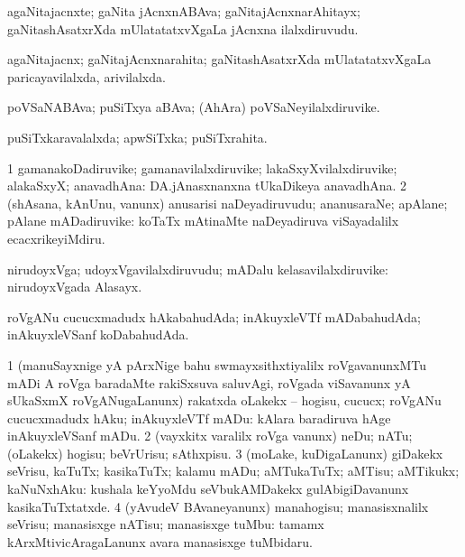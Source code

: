 \bentry
{}
\gl{\nA}
\bmng
agaNitajacnxte; gaNita jAcnxnABAva; gaNitajAcnxnarAhitayx; gaNitashAsatxrXda mUlatatatxvXgaLa jAcnxna ilalxdiruvudu. 
\emng
\eentry

\bentry
{}
\gl{\gu}
\bmng
agaNitajacnx; gaNitajAcnxnarahita; gaNitashAsatxrXda mUlatatatxvXgaLa paricayavilalxda, arivilalxda. 
\emng
\eentry

\bentry
{}
\gl{\nA}
\bmng
poVSaNABAva; puSiTxya aBAva; (AhAra) poVSaNeyilalxdiruvike. 
\emng
\eentry

\bentry
{}
\gl{\gu}
\bmng
puSiTxkaravalalxda; apwSiTxka; puSiTxrahita. 
\emng
\eentry

\bentry
{}
\gl{\nA}
\bmng
\bnum
\num{1} gamanakoDadiruvike; gamanavilalxdiruvike; lakaSxyXvilalxdiruvike; alakaSxyX; anavadhAna:  DA.jAnasxnanxna tUkaDikeya anavadhAna. 
\num{2} (shAsana, kAnUnu, \mo vanunx) anusarisi naDeyadiruvudu; ananusaraNe; apAlane; pAlane mADadiruvike:  koTaTx mAtinaMte naDeyadiruva viSayadalilx ecacxrikeyiMdiru. 
\enum
\emng
\eentry

\bentry
{}
\gl{\nA}
\bmng
nirudoyxVga; udoyxVgavilalxdiruvudu; mADalu kelasavilalxdiruvike:  nirudoyxVgada Alasayx. 
\emng
\eentry

\bentry
{}
\gl{\gu}
\bmng
roVgANu cucucxmadudx hAkabahudAda; inAkuyxleVTf mADabahudAda; inAkuyxleVSanf koDabahudAda. 
\emng
\eentry

\bentry
{}
\gl{\sakirx}
\bmng
\bnum
\num{1} (manuSayxnige yA pArxNige bahu swmayxsithxtiyalilx roVgavanunxMTu mADi A roVga baradaMte rakiSxsuva saluvAgi, roVgada viSavanunx yA sUkaSxmX roVgANugaLanunx) rakatxda oLakekx -- hogisu, cucucx; roVgANu cucucxmadudx hAku; inAkuyxleVTf mADu:  kAlara baradiruva hAge inAkuyxleVSanf mADu. 
\num{2} (vayxkitx \mo varalilx roVga \mo vanunx) neDu; nATu; (oLakekx) hogisu; beVrUrisu; sAthxpisu. 
\num{3} (moLake, kuDigaLanunx) giDakekx seVrisu, kaTuTx; kasikaTuTx; kalamu mADu; aMTukaTuTx; aMTisu; aMTikukx; kaNuNxhAku:  kushala keYyoMdu seVbukAMDakekx gulAbigiDavanunx kasikaTuTxtatxde. 
\num{4} (yAvudeV BAvaneyanunx) manahogisu; manasisxnalilx seVrisu; manasisxge nATisu; manasisxge tuMbu:  tamamx kArxMtivicAragaLanunx avara manasisxge tuMbidaru. 
\enum
\emng
\eentry

